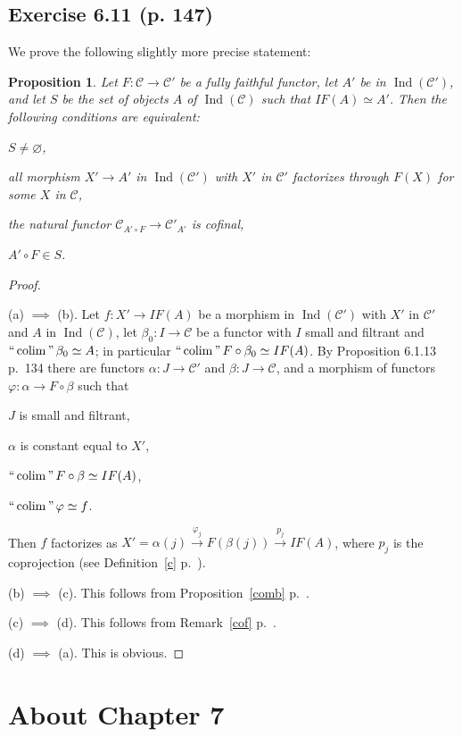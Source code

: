\documentclass[12pt]{article}
\newtheorem{prop}[thm]{Proposition}
\theoremstyle{remark}
\theoremstyle{definition}
\newcommand{\cc}{\mathcal}
\newcommand{\xr}{\xrightarrow}
\DeclareMathOperator*{\coli}{colim}
\DeclareMathOperator*{\ic}{``\coli"}
\DeclareMathOperator{\Ind}{Ind}
\begin{document}
\subsection{Exercise 6.11 (p. 147)} 
%
We prove the following slightly more precise statement: 
%
\begin{prop}\label{myprop1}
%
Let $F:\cc C\to\cc C'$ be a fully faithful functor, let $A'$ be in $\Ind(\cc C')$, and let $S$ be the set of objects $A$ of $\Ind(\cc C)$ such that $IF(A)\simeq A'$. Then the following conditions are equivalent: 

 $S\neq\varnothing$, 

 all morphism $X'\to A'$ in $\Ind(\cc C')$ with $X'$ in $\cc C'$ factorizes through $F(X)$ for some $X$ in $\cc C$, 

 the natural functor $\cc C_{A'\circ F}\to\cc C'_{A'}$ is cofinal, 

 $A'\circ F\in S$.
%
\end{prop}
%
\begin{proof}\ 

\noindent(a) $\implies$ (b). Let $f:X'\to IF(A)$ be a morphism in $\Ind(\cc C')$ with $X'$ in $\cc C'$ and $A$ in $\Ind(\cc C)$, let $\beta_0:I\to\cc C$ be a functor with $I$ small and filtrant and $\ic\beta_0\simeq A$; in particular $\ic F\circ\beta_0\simeq IF(A)$. By Proposition 6.1.13 p.~134 there are functors $\alpha:J\to\cc C'$ and $\beta:J\to\cc C$, and a morphism of functors $\varphi:\alpha\to F\circ\beta$ such that 

$J$ is small and filtrant, 

$\alpha$ is constant equal to $X'$, 

$\ic F\circ\beta\simeq IF(A)$, 

$\ic\varphi\simeq f$. 

\noindent Then $f$ factorizes as $X'=\alpha(j)\xr{\varphi_j}F(\beta(j))\xr{p_j}IF(A)$, where $p_j$ is the coprojection (see Definition~\ref{c} p.~\pageref{c}).

\noindent(b) $\implies$ (c). This follows from Proposition~\ref{comb} p.~\pageref{comb}. 

\noindent(c) $\implies$ (d). This follows from Remark~\ref{cof} p.~\pageref{cof}. 

\noindent(d) $\implies$ (a). This is obvious.
\end{proof}
%
%
\section{About Chapter 7}
%
\end{document}
